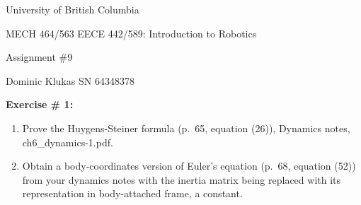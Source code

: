 \documentclass[11pt]{article}
\begin{document}
\begin{center}

{\Large University of British Columbia}

\vspace{0.2cm}

MECH 464/563 EECE 442/589: Introduction to Robotics

\vspace{0.1cm}

{\large Assignment \#9}

\vspace{0.1cm}

Dominic Klukas SN 64348378

\end{center}

\vspace{1em}

\noindent\textbf{Exercise \# 1:}
\begin{enumerate}
    \item[(a)] Prove the Huygens-Steiner formula (p.\ 65, equation (26)), Dynamics notes, ch6\_dynamics-1.pdf.
    \item[(b)] Obtain a body-coordinates version of Euler's equation (p.\ 68, equation (52)) from your dynamics notes with the inertia matrix being replaced with its representation in body-attached frame, a constant.
\end{enumerate}


\vspace{1em}
\end{document}
